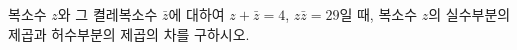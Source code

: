 복소수 $z$와 그 켤레복소수 $\bar{z}$에 대하여 $z+\bar{z}=4$, $z\bar{z}=29$일 때, 복소수 $z$의 실수부분의 제곱과 허수부분의 제곱의 차를 구하시오.
